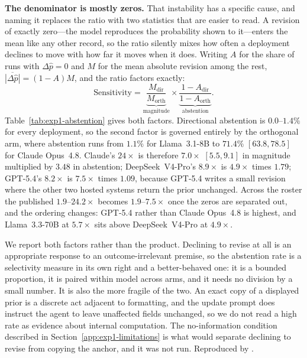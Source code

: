 \textbf{The denominator is mostly zeros.} That instability has a specific cause,
and naming it replaces the ratio with two statistics that are easier to read. A
revision of exactly zero---the model reproduces the probability shown to it---enters
the mean like any other record, so the ratio silently mixes how often a
deployment declines to move with how far it moves when it does. Writing $A$ for
the share of runs with $\Delta\hat p=0$ and $M$ for the mean absolute revision
among the rest, $\overline{|\Delta\hat p|}=(1-A)M$, and the ratio factors exactly:
\begin{equation}
  \mathrm{Sensitivity}
  =\underbrace{\frac{M_{\mathrm{dir}}}{M_{\mathrm{orth}}}}_{\text{magnitude}}
  \times\underbrace{\frac{1-A_{\mathrm{dir}}}{1-A_{\mathrm{orth}}}}_{\text{abstention}}.
  \label{eq:sensitivity-decomposition}
\end{equation}
Table~\ref{tab:exp1-abstention} gives both factors. Directional abstention is
$0.0$--$1.4\%$ for every deployment, so the second factor is governed entirely by
the orthogonal arm, where abstention runs from $1.1\%$ for Llama~3.1-8B to
$71.4\%$ $[63.8,78.5]$ for Claude Opus~4.8. Claude's $24\times$ is therefore
$7.0\times$ $[5.5,9.1]$ in magnitude multiplied by $3.48$ in abstention;
DeepSeek~V4-Pro's $8.9\times$ is $4.9\times$ times $1.79$; GPT-5.4's $8.2\times$
is $7.5\times$ times $1.09$, because GPT-5.4 writes a small revision where the
other two hosted systems return the prior unchanged. Across the roster the
published $1.9$--$24.2\times$ becomes $1.9$--$7.5\times$ once the zeros are
separated out, and the ordering changes: GPT-5.4 rather than Claude Opus~4.8 is
highest, and Llama~3.3-70B at $5.7\times$ sits above DeepSeek~V4-Pro at
$4.9\times$.

We report both factors rather than the product. Declining to revise at all is an
appropriate response to an outcome-irrelevant premise, so the abstention rate is
a selectivity measure in its own right and a better-behaved one: it is a bounded
proportion, it is paired within model across arms, and it needs no division by a
small number. It is also the more fragile of the two. An exact copy of a
displayed prior is a discrete act adjacent to formatting, and the update prompt
does instruct the agent to leave unaffected fields unchanged, so we do not read a
high rate as evidence about internal computation. The no-information condition
described in Section~\ref{app:exp1-limitations} is what would separate declining
to revise from copying the anchor, and it was not run. Reproduced by
.

